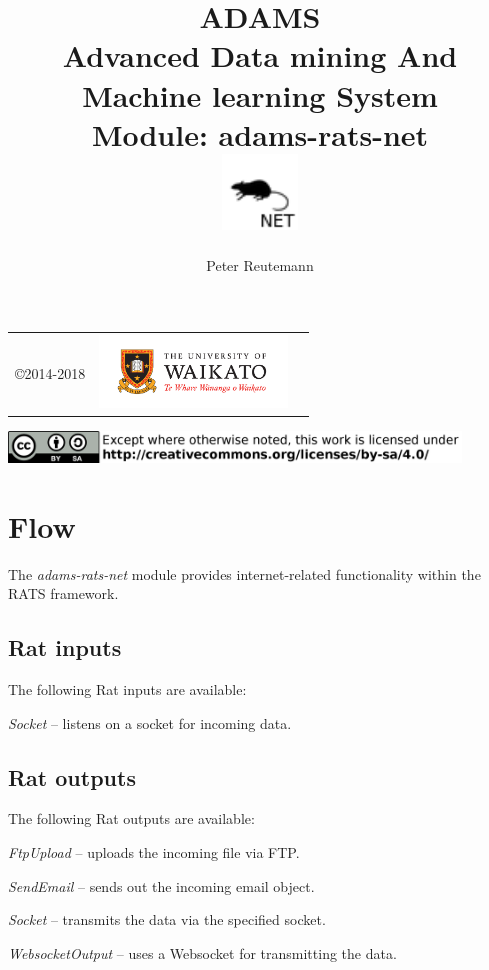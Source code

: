 \documentclass[a4paper]{book}
\title{
  \textbf{ADAMS} \\
  {\Large \textbf{A}dvanced \textbf{D}ata mining \textbf{A}nd \textbf{M}achine
  learning \textbf{S}ystem} \\
  {\Large Module: adams-rats-net} \\
  \vspace{1cm}
  \includegraphics[width=2cm]{images/rats-net-module.png} \\
}
\author{
  Peter Reutemann
}
\begin{document}
\begin{titlepage}
\maketitle

\thispagestyle{empty}
\center
\begin{table}[b]
	\begin{tabular}{c l l}
		\parbox[c][2cm]{2cm}{\copyright 2014-2018} &
		\parbox[c][2cm]{5cm}{\includegraphics[width=5cm]{images/coat_of_arms.pdf}}
	\end{tabular}
	\includegraphics[width=12cm]{images/cc.png} \\
\end{table}

\end{titlepage}

\tableofcontents

\chapter{Flow}

The \textit{adams-rats-net} module provides internet-related functionality
within the RATS framework.

\section{Rat inputs}
The following Rat inputs are available:
\begin{tight_itemize}
  \item \textit{Socket} -- listens on a socket for incoming data.
\end{tight_itemize}

\section{Rat outputs}
The following Rat outputs are available:
\begin{tight_itemize}
  \item \textit{FtpUpload} -- uploads the incoming file via FTP.
  \item \textit{SendEmail} -- sends out the incoming email object.
  \item \textit{Socket} -- transmits the data via the specified socket.
  \item \textit{WebsocketOutput} -- uses a Websocket\cite{websocket} for transmitting the data.
\end{tight_itemize}


\end{document}

